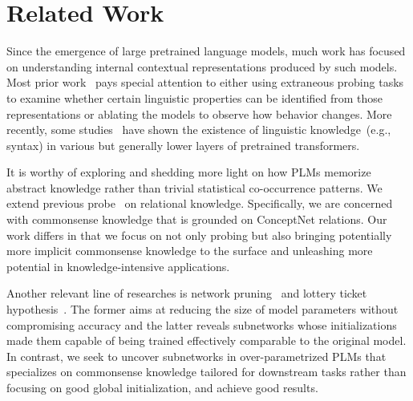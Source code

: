 \section{Related Work}
Since the emergence of large pretrained language models, 
much work has focused on understanding internal contextual representations 
produced by such models. Most prior work~\citep{shi-etal-2016-string,belinkov-etal-2017-neural} pays special attention to either using extraneous 
probing tasks to examine whether certain linguistic properties 
can be identified from those representations or ablating the models 
to observe how behavior changes. More recently, some studies~\citep{peters-etal-2018-dissecting,DBLP:journals/corr/abs-1901-05287,DBLP:journals/corr/abs-1905-06316} have shown the existence 
of linguistic knowledge~(e.g., syntax) in various but 
generally lower layers of pretrained transformers.

It is worthy of exploring and shedding more light on how PLMs 
memorize abstract knowledge rather than trivial statistical co-occurrence 
patterns.  We extend previous probe~\citep{Petroni2020} on relational 
knowledge. Specifically, we are concerned with commonsense knowledge 
that is grounded on ConceptNet relations. Our work differs in that 
we focus on not only probing but also bringing potentially more 
implicit commonsense knowledge to the surface and unleashing more 
potential in knowledge-intensive applications.

Another relevant line of researches is network 
pruning~\citep{liu2018rethinking,Lin2020Dynamic} and lottery ticket 
hypothesis~\citep{conf/iclr/FrankleC19,Prasanna2020,Chen2020}. 
The former aims at reducing the size of model parameters without 
compromising accuracy and the latter reveals subnetworks whose 
initializations made them capable of being trained effectively comparable 
to the original model. In contrast, we seek to uncover subnetworks in 
over-parametrized PLMs that specializes on commonsense knowledge 
tailored for downstream tasks rather than focusing on good global
initialization, and achieve good results. 
